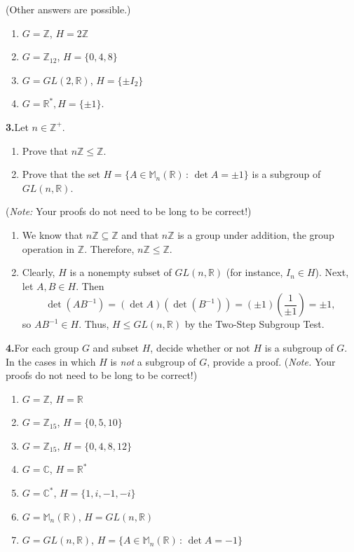\documentclass[10pt,]{book}
\theoremstyle{plain}
\theoremstyle{definition}
\theoremstyle{definition}
\theoremstyle{definition}
\theoremstyle{definition}
\numberwithin{equation}{section}
\def\Z{\mathbb{Z}}
\def\R{\mathbb{R}}
\def\C{\mathbb{C}}
\def\M{\mathbb{M}}
\begin{document}
(Other answers are possible.) \leavevmode%
\begin{enumerate}[label=(\alph*)]
\item\hypertarget{li-290}{}\(G=\Z\), \(H=2\Z\)%
\item\hypertarget{li-291}{}\(G=\Z_{12}\), \(H=\{0,4,8\}\)%
\item\hypertarget{li-292}{}\(G=GL(2,\R)\), \(H=\{\pm I_2\}\)%
\item\hypertarget{li-293}{}\(G=\R^*, H=\{\pm 1\}\).%
\end{enumerate}
%
\par\smallskip
\noindent\textbf{3.}\quad{}Let \(n\in \Z^+\). \leavevmode%
\begin{enumerate}[label=(\alph*)]
\item\hypertarget{li-294}{}Prove that \(n\Z \leq \Z\).%
\item\hypertarget{li-295}{}Prove that the set \(H=\{A\in \M_n(\R)\,:\,\det A=\pm 1\}\) is a subgroup of \(GL(n,\R)\).%
\end{enumerate}
%
\par
(\emph{Note:} Your proofs do not need to be long to be correct!)%
\par\smallskip
\leavevmode%
\begin{enumerate}[label=(\alph*)]
\item\hypertarget{li-296}{}We know that \(n\Z\subseteq \Z\) and that \(n\Z\) is a group under addition, the group operation in \(\Z\).  Therefore, \(n\Z\leq \Z\).%
\item\hypertarget{li-297}{}Clearly, \(H\) is a nonempty subset of \(GL(n,\R)\) (for instance, \(I_n\in H\)).  Next, let \(A,B\in H\). Then%
\begin{equation*}
\det(AB^{-1})=(\det A)(\det (B^{-1}))=(\pm 1)\left(\frac{1}{\pm 1}\right)=\pm 1,
\end{equation*}
so \(AB^{-1}\in H\).  Thus, \(H\leq GL(n,\R)\) by the Two-Step Subgroup Test.%
\end{enumerate}
\par\smallskip
\noindent\textbf{4.}\quad{}For each group \(G\) and subset \(H\), decide whether or not \(H\) is a subgroup of \(G\). In the cases in which \(H\) is \emph{not} a subgroup of \(G\), provide a proof. (\emph{Note.} Your proofs do not need to be long to be correct!) \leavevmode%
\begin{enumerate}[label=(\alph*)]
\item\hypertarget{li-298}{}\(G=\Z\), \(H=\R\)%
\item\hypertarget{li-299}{}\(G=\Z_{15}\), \(H=\{0,5,10\}\)%
\item\hypertarget{li-300}{}\(G=\Z_{15}\), \(H=\{0,4,8,12\}\)%
\item\hypertarget{li-301}{}\(G=\C\), \(H=\R^*\)%
\item\hypertarget{li-302}{}\(G=\C^*\), \(H=\{1,i,-1,-i\}\)%
\item\hypertarget{li-303}{}\(G=\M_n(\R)\), \(H=GL(n,\R)\)%
\item\hypertarget{li-304}{}\(G=GL(n,\R)\), \(H=\{A\in \M_n(\R)\,:\,\det A = -1\}\)%
\end{enumerate}
\end{document}
